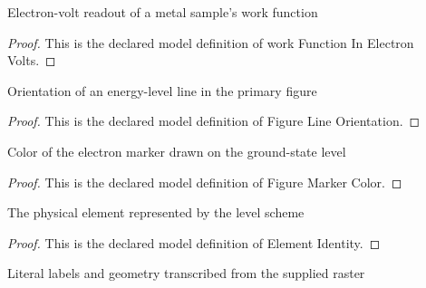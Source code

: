 \begin{definition}
  \label{def:physics:phyx-mini-0518:phyxminiproblems-problemphyxmini0518-workfunctioninelectronvolts}
  Electron-volt readout of a metal sample's work function
\end{definition}
\begin{proof}
  This is the declared model definition of work Function In Electron Volts.
\end{proof}
\begin{definition}
  \label{def:physics:phyx-mini-0518:phyxminiproblems-problemphyxmini0518-figurelineorientation}
  Orientation of an energy-level line in the primary figure
\end{definition}
\begin{proof}
  This is the declared model definition of Figure Line Orientation.
\end{proof}
\begin{definition}
  \label{def:physics:phyx-mini-0518:phyxminiproblems-problemphyxmini0518-figuremarkercolor}
  Color of the electron marker drawn on the ground-state level
\end{definition}
\begin{proof}
  This is the declared model definition of Figure Marker Color.
\end{proof}
\begin{definition}
  \label{def:physics:phyx-mini-0518:phyxminiproblems-problemphyxmini0518-elementidentity}
  The physical element represented by the level scheme
\end{definition}
\begin{proof}
  This is the declared model definition of Element Identity.
\end{proof}
\begin{definition}
  \label{def:physics:phyx-mini-0518:phyxminiproblems-problemphyxmini0518-searsiumenergylevelfigure}
  Literal labels and geometry transcribed from the supplied raster
\end{definition}
